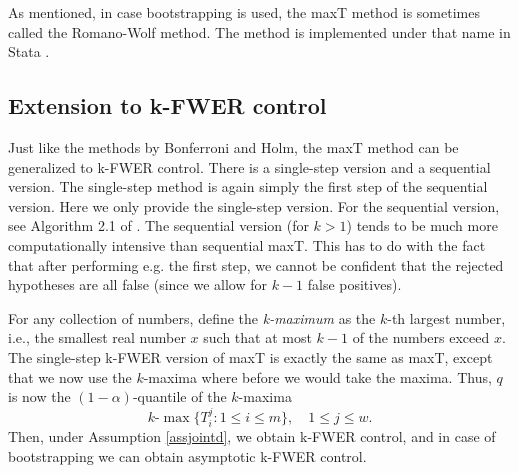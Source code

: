 \documentclass[11pt]{article}
\theoremstyle{plain}
\theoremstyle{definition}
\newcommand{\citt}{\citet}
\newcommand{\citp}{\citep}
\begin{document}
As mentioned, in case bootstrapping is used, the maxT method is sometimes called the Romano-Wolf method. The method is implemented under that name in Stata \citp{clarke2020romano}.



\subsection{Extension to k-FWER control} \label{secmaxTkFWER}
Just like the methods by  Bonferroni and Holm, the maxT method can be generalized to k-FWER control. There is a single-step version and a sequential version. The  single-step method is again simply the first step of the sequential version. Here we only provide the single-step version. For the sequential version, see Algorithm 2.1 of \citt{romano2007control}. The sequential version (for $k>1$) tends to be much more computationally intensive than  sequential maxT. This has to do with the fact that after performing e.g. the first step, we cannot be confident that the rejected hypotheses are all false (since we allow for $k-1$ false positives).

For any collection of numbers, define the \emph{k-maximum} as the $k$-th largest number, i.e., the smallest real number $x$ such that at most $k-1$ of the numbers exceed $x$.
The single-step k-FWER version of maxT is exactly the same as maxT, except that we now use the $k$-maxima where before we would take the maxima. Thus, $q$ is now the $(1-\alpha)$-quantile of the $k$-maxima 
$$k\text{-}\max\{T_i^j: 1\leq i \leq m\},\quad 1\leq j \leq w.$$
Then, under Assumption \ref{assjointd}, we obtain  k-FWER control, and in case of bootstrapping we can obtain asymptotic k-FWER control.
\end{document}
